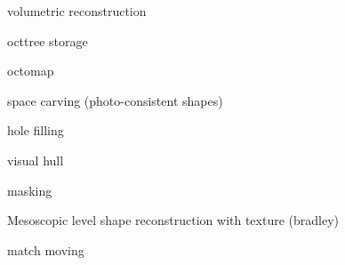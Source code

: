 volumetric reconstruction

octtree storage

octomap

space carving (photo-consistent shapes)

hole filling

visual hull

masking

Mesoscopic level shape reconstruction with texture (bradley)

match moving





